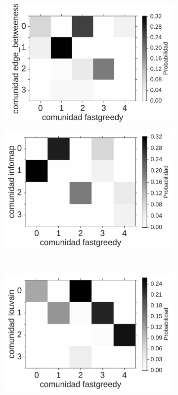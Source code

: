 {\begin{figure}[!ht]
    \centering
    \begin{subfigure}[b]{.45\columnwidth}
        \includegraphics[width=0.95\columnwidth]{figuras/join_proba_fastgreedy-edge_betweeness.pdf}
    \end{subfigure}
    \begin{subfigure}[b]{.45\columnwidth}
        \includegraphics[width=0.95\columnwidth]{figuras/join_proba_fastgreedy-infomap.pdf}
    \end{subfigure}\\
    \begin{subfigure}[b]{.45\columnwidth}
        \includegraphics[width=0.95\columnwidth]{figuras/join_proba_fastgreedy-louvain.pdf}

\end{subfigure}
\end{figure}}
